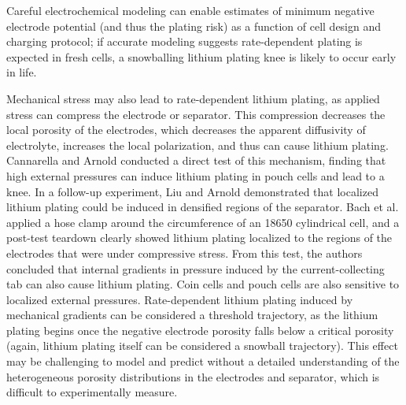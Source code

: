 \documentclass[journal=jpclcd,manuscript=article]{achemso}
\begin{document}
Careful electrochemical modeling can enable estimates of minimum negative electrode potential (and thus the plating risk) as a function of cell design and charging protocol\cite{yang_understanding_2018}{}; if accurate modeling suggests rate-dependent plating is expected in fresh cells, a snowballing lithium plating knee is likely to occur early in life.

Mechanical stress may also lead to rate-dependent lithium plating, as applied stress can compress the electrode or separator. This compression decreases the local porosity of the electrodes, which decreases the apparent diffusivity of electrolyte, increases the local polarization, and thus can cause lithium plating. Cannarella and Arnold\cite{cannarella_stress_2014} conducted a direct test of this mechanism, finding that high external pressures can induce lithium plating in pouch cells and lead to a knee. In a follow-up experiment, Liu and Arnold\cite{liu_effects_2020} demonstrated that localized lithium plating could be induced in densified regions of the separator. Bach et al.\cite{bach_nonlinear_2016} applied a hose clamp around the circumference of an 18650 cylindrical cell, and a post-test teardown clearly showed lithium plating localized to the regions of the electrodes that were under compressive stress. From this test, the authors concluded that internal gradients in pressure induced by the current-collecting tab can also cause lithium plating. Coin cells and pouch cells are also sensitive to localized external pressures.\cite{liu_size_2018, fuchs_post-mortem_2019, okasinski_situ_2020}
Rate-dependent lithium plating induced by mechanical gradients can be considered a threshold trajectory, as the lithium plating begins once the negative electrode porosity falls below a critical porosity (again, lithium plating itself can be considered a snowball trajectory).
This effect may be challenging to model and predict without a detailed understanding of the heterogeneous porosity distributions in the electrodes and separator, which is difficult to experimentally measure.
\end{document}
